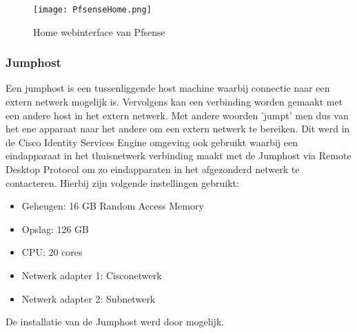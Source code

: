 \begin{figure}[H]
	\centering
	\texttt{[image: PfsenseHome.png]}
	\caption{Home webinterface van Pfsense}
	\label{fig:Pfsense}
\end{figure}

\subsubsection{Jumphost}
Een jumphost is een tussenliggende host machine waarbij connectie naar een extern netwerk mogelijk is. Vervolgens kan een verbinding worden gemaakt met een andere host in het extern netwerk. Met andere woorden 'jumpt' men dus van het ene apparaat naar het andere om een extern netwerk te bereiken. 
\newline
\newline
Dit werd in de Cisco Identity Services Engine omgeving ook gebruikt waarbij een eindapparaat in het thuisnetwerk verbinding maakt met de Jumphost via Remote Desktop Protocol om zo eindapparaten in het afgezonderd netwerk te contacteren. Hierbij zijn volgende instellingen gebruikt:  
 
 
\begin{itemize}
	\item Geheugen: 16 GB Random Access Memory
	\item Opslag: 126 GB
	\item CPU: 20 cores
	\item Netwerk adapter 1: Cisco\textunderscore netwerk
	\item Netwerk adapter 2: Sub\textunderscore netwerk
\end{itemize}

De installatie van de Jumphost werd door \cite{Win19_InstallationGuide} mogelijk. 

